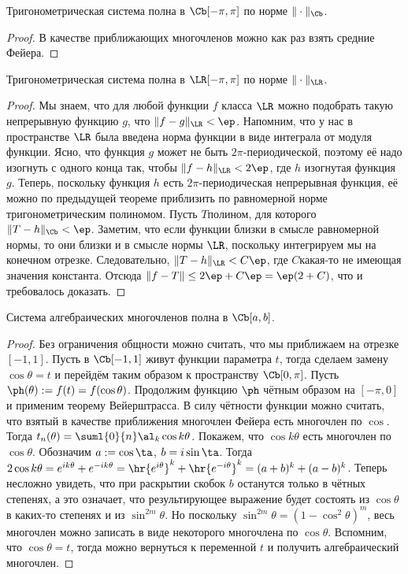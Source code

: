 \documentclass[a4paper]{article}
\begin{document}
\begin{theorem}[Вейерштрасса]
Тригонометрическая система полна в $\Cb[-\pi,\pi]$ по норме $\|\cdot\|_{\Cb}$.
\end{theorem}
\begin{proof}
В качестве приближающих многочленов можно как раз взять средние Фейера.
\end{proof}

\begin{imp}
Тригонометрическая система полна в $\LR[-\pi,\pi]$ по норме $\|\cdot\|_{\LR}$.
\end{imp}
\begin{proof}
Мы знаем, что для любой функции $f$ класса $\LR$ можно подобрать такую непрерывную функцию $g$, что $\|f - g\|_{\LR} < \ep$.
Напомним, что у нас в пространстве $\LR$ была введена норма функции в виде интеграла от модуля функции. Ясно, что функция $g$
может не быть $2\pi$-периодической, поэтому её надо изогнуть с одного конца так, чтобы $\|f - h\|_{\LR} < 2\ep$, где $h$\т
изогнутая функция $g$. Теперь, поскольку функция $h$ есть $2\pi$-периодическая непрерывная функция, её можно по предыдущей
теореме приблизить по равномерной норме тригонометрическим полиномом. Пусть $T$\т полином, для которого $\|T - h\|_{\Cb} < \ep$.
Заметим, что если функции близки в смысле равномерной нормы, то они близки и в смысле нормы $\LR$, поскольку интегрируем
мы на конечном отрезке. Следовательно, $\|T-h\|_{\LR} < C\ep$, где $C$\т какая-то не имеющая значения константа.
Отсюда $\|f - T\| \le 2\ep + C\ep = \ep(2 + C)$, что и требовалось доказать.
\end{proof}

\begin{theorem}[Вейерштрасса\т II]
Система алгебраических многочленов полна в $\Cb[a,b]$.
\end{theorem}
\begin{proof}
Без ограничения общности можно считать, что мы приближаем на отрезке $[-1,1]$. Пусть в $\Cb[-1,1]$ живут функции параметра $t$,
тогда сделаем замену $\cos \theta = t$ и перейдём таким образом к пространству $\Cb[0,\pi]$. Пусть $\ph(\theta) := f(t) = f(\cos \theta)$. Продолжим
функцию $\ph$ чётным образом на $[-\pi,0]$ и применим теорему Вейерштрасса. В силу чётности функции можно считать, что взятый в качестве
приближения многочлен Фейера есть многочлен по $\cos$. Тогда $t_n(\theta) = \suml{0}{n}\al_k\cos k\theta$. Покажем, что
$\cos k\theta$ есть многочлен по $\cos\theta$. Обозначим $a := \cos\ta$, $b=i\sin\ta$. Тогда
$2\cos k\theta = e^{ik\theta} + e^{-ik\theta}=\hr{e^{i\theta}}^k + \hr{e^{-i\theta}}^k=
(a+b)^k + (a-b)^k$.
Теперь несложно увидеть, что при раскрытии скобок $b$ останутся только в чётных степенях, а это означает, что
результирующее выражение будет состоять из $\cos\theta$ в каких-то степенях и из $\sin^{2m}\theta$. Но поскольку $\sin^{2m}\theta = (1-\cos^2\theta)^m$,
весь многочлен можно записать в виде некоторого многочлена по $\cos \theta$. Вспомним, что $\cos\theta = t$, тогда можно вернуться к переменной $t$ и
получить алгебраический многочлен.
\end{proof}
\end{document}
